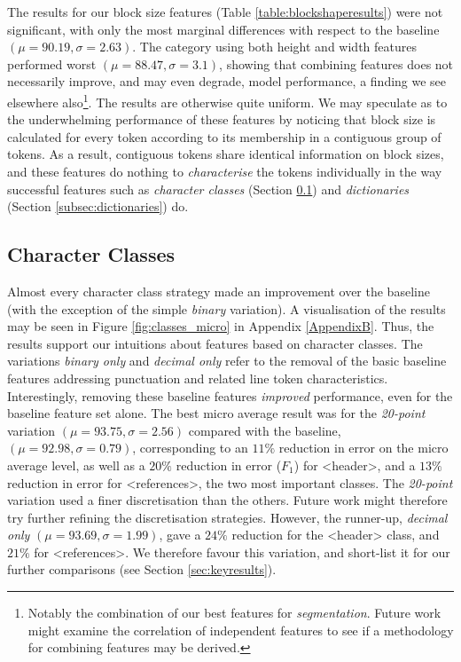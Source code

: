 The results for our block size features (Table \ref{table:blockshaperesults}) were not significant, with only the most marginal differences with respect to the baseline $(\mu = 90.19, \sigma = 2.63)$. The category using both height and width features performed worst $(\mu = 88.47, \sigma = 3.1)$, showing that combining features does not necessarily improve, and may even degrade, model performance, a finding we see elsewhere also\footnote{Notably the combination of our best features for \emph{segmentation}. Future work might examine the correlation of independent features to see if a methodology for combining features may be derived.}. The results are otherwise quite uniform. We may speculate as to the underwhelming performance of these features by noticing that block size is calculated for every token according to its membership in a contiguous group of tokens. As a result, contiguous tokens share identical information on block sizes, and these features do nothing to \emph{characterise} the tokens individually in the way successful features such as \emph{character classes} (Section \ref{subsec:characterclassresults}) and  \emph{dictionaries} (Section \ref{subsec:dictionaries}) do.

\subsection{Character Classes}
\label{subsec:characterclassresults}

Almost every character class strategy made an improvement over the baseline (with the exception of the simple \emph{binary} variation). A visualisation of the results may be seen in Figure \ref{fig:classes_micro} in Appendix \ref{AppendixB}. Thus, the results support our intuitions about features based on character classes. The variations \emph{binary only} and \emph{decimal only} refer to the removal of the basic baseline features addressing punctuation and related line token characteristics. Interestingly, removing these baseline features \emph{improved} performance, even for the baseline feature set alone. The best micro average result was for the \emph{20-point} variation $(\mu = 93.75, \sigma = 2.56)$ compared with the baseline, $(\mu = 92.98, \sigma = 0.79)$, corresponding to an $11\%$ reduction in error on the micro average level, as well as a $20\%$ reduction in error ($F_1$) for <header>, and a $13\%$ reduction in error for <references>, the two most important classes. The \emph{20-point} variation used a finer discretisation than the others. Future work might therefore try further refining the discretisation strategies. However, the runner-up, \emph{decimal only} $(\mu = 93.69, \sigma = 1.99)$, gave a $24\%$ reduction for the <header> class, and $21\%$ for <references>. We therefore favour this variation, and short-list it for our further comparisons (see Section \ref{sec:keyresults}).

